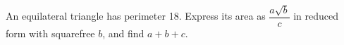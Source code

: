 An equilateral triangle has perimeter 18. Express its area as $\dfrac{a\sqrt b}{c}$ in reduced form with squarefree $b$, and find $a+b+c$.
